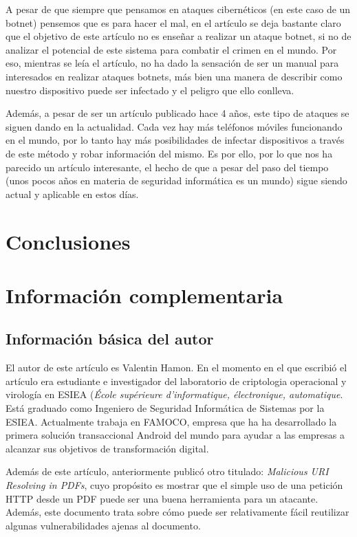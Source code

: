 \documentclass[a4paper,11pt]{report}
\begin{document}
A pesar de que siempre que pensamos en ataques cibernéticos (en este caso de un botnet) pensemos que es para hacer el mal, en el artículo se deja bastante claro que el objetivo de este artículo no es enseñar a realizar un ataque botnet, si no de analizar el potencial de este sistema para combatir el crimen en el mundo. Por eso, mientras se leía el artículo, no ha dado la sensación de ser un manual para interesados en realizar ataques botnets, más bien una manera de describir como nuestro dispositivo puede ser infectado y el peligro que ello conlleva.

Además, a pesar de ser un artículo publicado hace 4 años, este tipo de ataques se siguen dando en la actualidad. Cada vez hay más teléfonos móviles funcionando en el mundo, por lo tanto hay más posibilidades de infectar dispositivos a través de este método y robar información del mismo. Es por ello, por lo que nos ha parecido un artículo interesante, el hecho de que a pesar del paso del tiempo (unos pocos años en materia de seguridad informática es un mundo) sigue siendo actual y aplicable en estos días.


\chapter{Conclusiones} \label{conclusiones}






\chapter{Información complementaria}
\section{Información básica del autor}
El autor de este artículo es Valentin Hamon. En el momento en el que escribió el artículo era estudiante e investigador del laboratorio de criptologia operacional y virología en ESIEA (\emph{École supérieure d'informatique, électronique, automatique}. Está graduado como Ingeniero de Seguridad Informática de Sistemas por la ESIEA. Actualmente trabaja en FAMOCO, empresa que ha ha desarrollado la primera solución transaccional Android del mundo para ayudar a las empresas a alcanzar sus objetivos de transformación digital.

Además de este artículo, anteriormente publicó otro titulado: \emph{Malicious URI Resolving in PDFs}, cuyo propósito es mostrar que el simple uso de una petición HTTP desde un PDF puede ser una buena herramienta  para un atacante. Además, este documento trata sobre cómo puede ser relativamente fácil reutilizar algunas vulnerabilidades ajenas al documento. 
\end{document}
